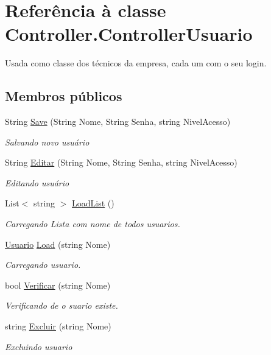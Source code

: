 \hypertarget{class_controller_1_1_controller_usuario}{}\section{Referência à classe Controller.\+Controller\+Usuario}
\label{class_controller_1_1_controller_usuario}


Usada como classe dos técnicos da empresa, cada um com o seu login.  


\subsection*{Membros públicos}
\begin{DoxyCompactItemize}
\item 
String \hyperlink{class_controller_1_1_controller_usuario_a840f9969ab5d409c93e1dc611b33eabb}{Save} (String Nome, String Senha, string Nivel\+Acesso)
\begin{DoxyCompactList}\small\item\em Salvando novo usuário \end{DoxyCompactList}\item 
String \hyperlink{class_controller_1_1_controller_usuario_a23f45f02d1ed4c2133d04a55054dc5ce}{Editar} (String Nome, String Senha, string Nivel\+Acesso)
\begin{DoxyCompactList}\small\item\em Editando usuário \end{DoxyCompactList}\item 
List$<$ string $>$ \hyperlink{class_controller_1_1_controller_usuario_af43a78895ded4dfa4071eadb4240cecf}{Load\+List} ()
\begin{DoxyCompactList}\small\item\em Carregando Lista com nome de todos usuarios. \end{DoxyCompactList}\item 
\hyperlink{class_model_1_1_pessoa__e___usuario_1_1_usuario}{Usuario} \hyperlink{class_controller_1_1_controller_usuario_a7997d115eeb602c364531c4b36b930ce}{Load} (string Nome)
\begin{DoxyCompactList}\small\item\em Carregando usuario. \end{DoxyCompactList}\item 
bool \hyperlink{class_controller_1_1_controller_usuario_a294b40e14dc957adeed550a59a7599f9}{Verificar} (string Nome)
\begin{DoxyCompactList}\small\item\em Verificando de o suario existe. \end{DoxyCompactList}\item 
string \hyperlink{class_controller_1_1_controller_usuario_a1b47fa4512b981da2a5334a61c9df8d7}{Excluir} (string Nome)
\begin{DoxyCompactList}\small\item\em Excluindo usuario \end{DoxyCompactList}\end{DoxyCompactItemize}


